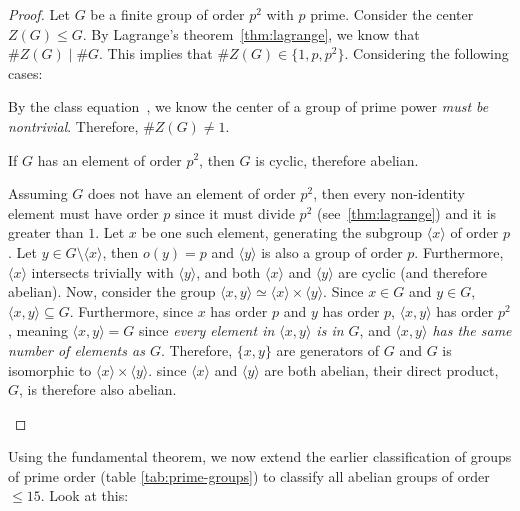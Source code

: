 \begin{proof}
  Let $G$ be a finite group of order $p^2$ with $p$ prime.
  Consider the center $Z(G) \le G$.
  By Lagrange's theorem~\ref{thm:lagrange}, we know that $\#Z(G) \mid \#G$.
  This implies that $\#Z(G) \in \{1,p,p^2\}$. Considering the following cases:
  \begin{enumalph}
    \item By the class equation~\cite[p.~125,~Theorem~8]{DummitFoote},
      we know the center of a group of prime power \emph{must be nontrivial}.
      Therefore, $\#Z(G) \ne 1$.
    \item If $G$ has an element of order $p^2$, then $G$ is cyclic, therefore
      abelian.
    \item Assuming $G$ does not have an element of order $p^2$,
      then every non-identity element must have order $p$ since it must divide $p^2$
      (see~\ref{thm:lagrange}) and it is greater than $1$.
      Let $x$ be one such element, generating the subgroup $\langle x \rangle$ of order $p$.
      Let $y \in G \setminus \langle x \rangle$, then $o(y) = p$
      and $\langle y \rangle$ is also a group of order $p$.
      Furthermore, $\langle x \rangle$ intersects trivially with $\langle y \rangle$,
      and both $\langle x \rangle$ and $\langle y \rangle$ are cyclic
      (and therefore abelian).
      Now, consider the group $\langle x, y \rangle \simeq
      \langle x \rangle \times \langle y \rangle$.
      Since $x \in G$ and $y \in G$, $\langle x, y \rangle \subseteq G$.
      Furthermore, since $x$ has order $p$ and $y$ has order $p$,
      $\langle x, y \rangle$ has order $p^2$,
      meaning $\langle x, y \rangle = G$ since
      \emph{every element in $\langle x, y \rangle$ is in $G$},
      and \emph{$\langle x, y \rangle$ has the same number of elements as $G$}.
      Therefore, $\{ x, y \}$ are generators of $G$
      and $G$ is isomorphic to $\langle x \rangle \times \langle y \rangle$.
      since $\langle x \rangle$ and $\langle y \rangle$ are both abelian,
      their direct product, $G$, is therefore also abelian.
  \end{enumalph}
\end{proof}

Using the fundamental theorem, we now extend the earlier classification
of groups of prime order (table \ref{tab:prime-groups})
to classify all abelian groups of order $\le 15$.
Look at this:

